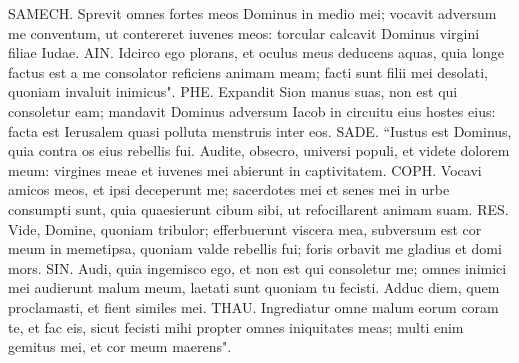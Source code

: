\begin{biblechapter}
\verse SAMECH. Sprevit omnes fortes meos Dominus in medio mei; vocavit adversum me conventum, ut contereret iuvenes meos: torcular calcavit Dominus virgini filiae Iudae. 
\verse AIN. Idcirco ego plorans, et oculus meus deducens aquas, quia longe factus est a me consolator reficiens animam meam; facti sunt filii mei desolati, quoniam invaluit inimicus". 
\verse PHE. Expandit Sion manus suas, non est qui consoletur eam; mandavit Dominus adversum Iacob in circuitu eius hostes eius: facta est Ierusalem quasi polluta menstruis inter eos. 
\verse SADE. “Iustus est Dominus, quia contra os eius rebellis fui. Audite, obsecro, universi populi, et videte dolorem meum: virgines meae et iuvenes mei abierunt in captivitatem. 
\verse COPH. Vocavi amicos meos, et ipsi deceperunt me; sacerdotes mei et senes mei in urbe consumpti sunt, quia quaesierunt cibum sibi, ut refocillarent animam suam. 
\verse RES. Vide, Domine, quoniam tribulor; efferbuerunt viscera mea, subversum est cor meum in memetipsa, quoniam valde rebellis fui; foris orbavit me gladius et domi mors. 
\verse SIN. Audi, quia ingemisco ego, et non est qui consoletur me; omnes inimici mei audierunt malum meum, laetati sunt quoniam tu fecisti. Adduc diem, quem proclamasti, et fient similes mei. 
\verse THAU. Ingrediatur omne malum eorum coram te, et fac eis, sicut fecisti mihi propter omnes iniquitates meas; multi enim gemitus mei, et cor meum maerens". 
\end{biblechapter}

